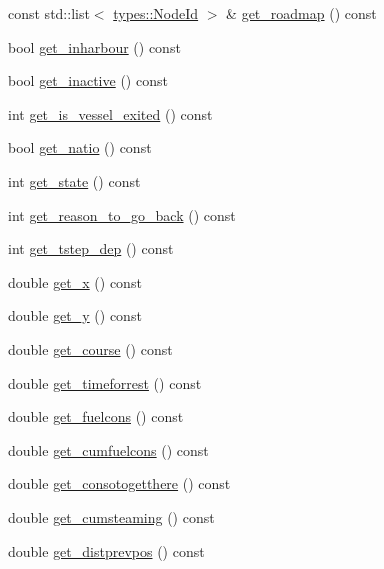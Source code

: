 \begin{DoxyCompactItemize}
\item 
const std\+::list$<$ \mbox{\hyperlink{classtypes_1_1_node_id}{types\+::\+Node\+Id}} $>$ \& \mbox{\hyperlink{class_vessel_a4b9c3a1c828a54b903c61d80539f1eaf}{get\+\_\+roadmap}} () const
\item 
bool \mbox{\hyperlink{class_vessel_a1bc0f03b67da8730c869165275c2018d}{get\+\_\+inharbour}} () const
\item 
bool \mbox{\hyperlink{class_vessel_af2ed11c22dbf53160045be4d10546835}{get\+\_\+inactive}} () const
\item 
int \mbox{\hyperlink{class_vessel_a0b131e89c0cbbe611f8a3422569b5ed1}{get\+\_\+is\+\_\+vessel\+\_\+exited}} () const
\item 
bool \mbox{\hyperlink{class_vessel_a398d5d7742214cab8284d00fa429e1de}{get\+\_\+natio}} () const
\item 
int \mbox{\hyperlink{class_vessel_a5d37b1cf2f31c652ddef41f3c6659a2d}{get\+\_\+state}} () const
\item 
int \mbox{\hyperlink{class_vessel_ae6dfc75558f82868dc043e5b06051d2b}{get\+\_\+reason\+\_\+to\+\_\+go\+\_\+back}} () const
\item 
int \mbox{\hyperlink{class_vessel_a0c262c624e2b5adbff070880a44c8a5e}{get\+\_\+tstep\+\_\+dep}} () const
\item 
double \mbox{\hyperlink{class_vessel_a0289d65048051697e3196e6263c45f89}{get\+\_\+x}} () const
\item 
double \mbox{\hyperlink{class_vessel_a1df8729ae670041c19a66d98dd00e07f}{get\+\_\+y}} () const
\item 
double \mbox{\hyperlink{class_vessel_a61b4070a5b211937bd08d23a95aa8ee8}{get\+\_\+course}} () const
\item 
double \mbox{\hyperlink{class_vessel_afda93a057b0515a58c908d8eaebd7a0c}{get\+\_\+timeforrest}} () const
\item 
double \mbox{\hyperlink{class_vessel_ae7b858da326bd11b36578fbcb35c78de}{get\+\_\+fuelcons}} () const
\item 
double \mbox{\hyperlink{class_vessel_aa496d9bf00f8eae969c7313617c87f60}{get\+\_\+cumfuelcons}} () const
\item 
double \mbox{\hyperlink{class_vessel_a499e354d86723b1f055a7357484d3359}{get\+\_\+consotogetthere}} () const
\item 
double \mbox{\hyperlink{class_vessel_a43abe92a9ed7708b26e9d350958eefff}{get\+\_\+cumsteaming}} () const
\item 
double \mbox{\hyperlink{class_vessel_a24d41cf7b950b9a1258077b2ce1555f3}{get\+\_\+distprevpos}} () const

\end{DoxyCompactItemize}
